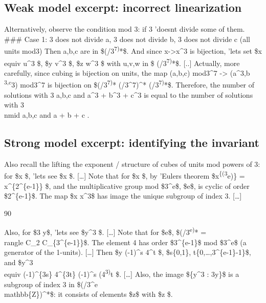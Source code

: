 \documentclass[
  10
]{article}
\begin{document}
\subsection{Weak model excerpt: incorrect
linearization}\label{weak-model-excerpt-incorrect-linearization}

Alternatively, observe the condition mod 3: if 3 'doesnt divide some of
them. \#\#\# Case 1: 3 does not divide a, 3 does not divide b, 3 does
not divide c (all units mod3) Then a,b,c are in
\$(/3\textsuperscript{7)}*\$. And since
x-\textgreater x\^{}3 is bijection, 'lets set \$x\\
equiv u\^{}3 \$, \$y \equiv v\^{}3 \$, \$z
\equiv w\^{}3 \$ with u,v,w in \$
(/3\textsuperscript{7)}*\$. {[}..{]} Actually, more
carefully, since cubing is bijection on units, the map (a,b,c) mod3\^{}7
-\textgreater{} (a\^{}3,b \textsuperscript{3,c}3) mod3\^{}7 is bijection
on \$(/3\textsuperscript{7)}*
\times (/3\^{}7)\^{}* \times (/3\textsuperscript{7)}*\$.
Therefore, the number of solutions with 3 \nmid a,b,c and a\^{}3 +
b\^{}3 + c\^{}3   is equal to the number of solutions
with 3\\
nmid a,b,c and a + b + c  .

\subsection{Strong model excerpt: identifying the
invariant}\label{strong-model-excerpt-identifying-the-invariant}

Also recall the lifting the exponent / structure of cubes of units mod
powers of 3: for \$x \not {} \$, 'lets see \$x
\$. {[}\ldots{]} Note that for \$x \not{} \$, by
'Eulers theorem \$x\textsuperscript{\{\phi(3}e)\} =
x\^{}\{2\^{}\{e-1\}\}  \$, and the
multiplicative group mod \$3\^{}e\$, \$e\$, is cyclic of order
\$2\^{}\{e-1\}\$. The map \$x \mapsto x\^{}3\$ has image the
unique subgroup of index 3. {[}\ldots{]}

90

Also, for \$3 \nmid y\$, 'lets see \$y\^{}3 \$. {[}\ldots{]}
Note that for \$e\$, \$(/3\textsuperscript{e)}*
=  \rangle \times {}\\
rangle \cong C\_2 \times C\_\{3\^{}\{e-1\}\}\$. The element 4 has order
\$3\^{}\{e-1\}\$ mod \$3\^{}e\$ (a generator of the 1-units).
{[}\ldots{]} Then \$y \equiv (-1)\^{}s 4\^{}t \$,
\$s\in\{0,1\}, t\in\{0,\ldots,3\^{}\{e-1\}-1\}\$, and \$y\^{}3\\
equiv (-1)\^{}\{3s\} 4\^{}\{3t\} \equiv (-1)\^{}s
(4\textsuperscript{3)}t \$. {[}\ldots{]} Also, the image
\$\{y\^{}3  : 3\nmid y\}\$ is a subgroup of index 3 in
\$(/3\^{}e\\
mathbb\{Z\})\^{}*\$: it consists of elements \$z\$ with \$z \equiv {}
\$.
\end{document}
